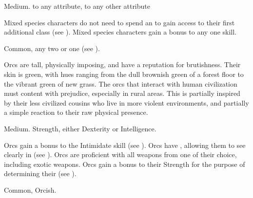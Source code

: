    Medium.
    to any attribute,  to any other attribute
  \begin{raggeditemize}
     Mixed species characters do not need to spend an  to gain access to their first additional class (see ).
     Mixed species characters gain a  bonus to any one skill.
  \end{raggeditemize}
   Common, any two  or one  (see ).


  Orcs are tall, physically imposing, and have a reputation for brutishness.
  Their skin is green, with hues ranging from the dull brownish green of a forest floor to the vibrant green of new grass.
  The orcs that interact with human civilization must content with prejudice, especially in rural areas.
  This is partially inspired by their less civilized cousins who live in more violent environments, and partially a simple reaction to their raw physical presence.

   Medium.
    Strength, either  Dexterity or  Intelligence.
  \begin{raggeditemize}
     Orcs gain a  bonus to the Intimidate skill (see ).
     Orcs have , allowing them to see clearly in  (see ).
     Orcs are proficient with all weapons from one  of their choice, including exotic weapons.
     Orcs gain a  bonus to their Strength for the purpose of determining their  (see ).
  \end{raggeditemize}
   Common, Orcish.

